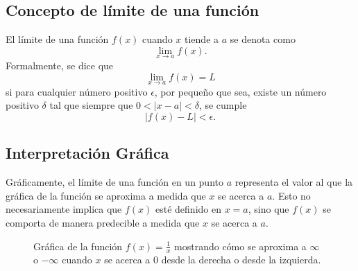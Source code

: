 \subsection{Concepto de límite de una función}


\begin{definition}[Limite]
    El límite de una función \( f(x) \) cuando \( x \) tiende a \( a \) se denota como
\[
\lim_{x \to a} f(x).
\]
Formalmente, se dice que
\[
\lim_{x \to a} f(x) = L
\]
si para cualquier número positivo \( \epsilon \), por pequeño que sea, existe un número positivo \( \delta \) tal que siempre que \( 0 < |x - a| < \delta \), se cumple
\[
|f(x) - L| < \epsilon.
\]
\end{definition}

\subsection{Interpretación Gráfica}

Gráficamente, el límite de una función en un punto \( a \) representa el valor al que la gráfica de la función se aproxima a medida que \( x \) se acerca a \( a \). Esto no necesariamente implica que \( f(x) \) esté definido en \( x = a \), sino que \( f(x) \) se comporta de manera predecible a medida que \( x \) se acerca a \( a \).

\begin{figure}[h!]
    \centering
    \caption{Gráfica de la función $f(x) = \frac{1}{x}$ mostrando cómo se aproxima a $\infty$ o $-\infty$ cuando $x$ se acerca a 0 desde la derecha o desde la izquierda.}
    \end{figure}
    

